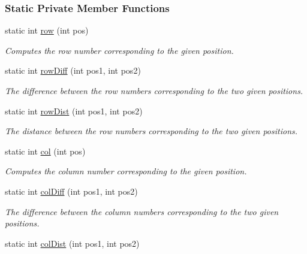 \subsubsection*{Static Private Member Functions}
\begin{DoxyCompactItemize}
\item 
static int \hyperlink{structslb_1_1ext_1_1domain_1_1sliding__tile_1_1SlidingTile_a2a825815709bc895b3926da165cc8e17}{row} (int pos)
\begin{DoxyCompactList}\small\item\em Computes the row number corresponding to the given position. \end{DoxyCompactList}\item 
static int \hyperlink{structslb_1_1ext_1_1domain_1_1sliding__tile_1_1SlidingTile_ac3c046cb012a8c4298e1d287f28caaf3}{row\+Diff} (int pos1, int pos2)
\begin{DoxyCompactList}\small\item\em The difference between the row numbers corresponding to the two given positions. \end{DoxyCompactList}\item 
static int \hyperlink{structslb_1_1ext_1_1domain_1_1sliding__tile_1_1SlidingTile_a9339389af6d038bb0699248d1e69890b}{row\+Dist} (int pos1, int pos2)
\begin{DoxyCompactList}\small\item\em The distance between the row numbers corresponding to the two given positions. \end{DoxyCompactList}\item 
static int \hyperlink{structslb_1_1ext_1_1domain_1_1sliding__tile_1_1SlidingTile_a1cd545116fe1688cdf58415222f167f7}{col} (int pos)
\begin{DoxyCompactList}\small\item\em Computes the column number corresponding to the given position. \end{DoxyCompactList}\item 
static int \hyperlink{structslb_1_1ext_1_1domain_1_1sliding__tile_1_1SlidingTile_aeffc0c584f55d1eb31a50a88ed1315d6}{col\+Diff} (int pos1, int pos2)
\begin{DoxyCompactList}\small\item\em The difference between the column numbers corresponding to the two given positions. \end{DoxyCompactList}\item 
static int \hyperlink{structslb_1_1ext_1_1domain_1_1sliding__tile_1_1SlidingTile_a4e42075a87a7e34fafc8493803f47638}{col\+Dist} (int pos1, int pos2)

\end{DoxyCompactItemize}
